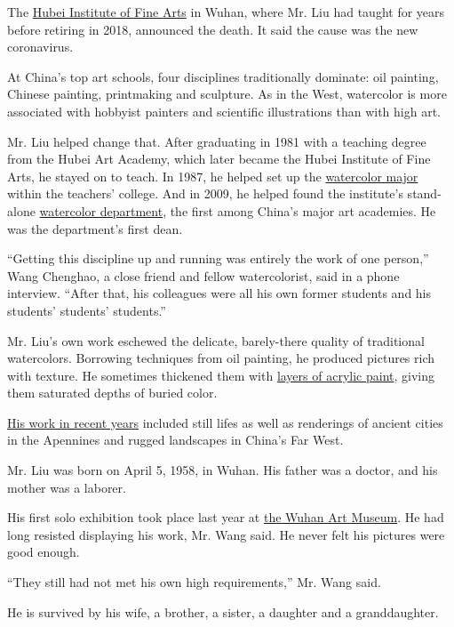 The \href{http://news.hifa.edu.cn/xxxw/xxxw/68034.htm}{Hubei Institute
of Fine Arts} in Wuhan, where Mr. Liu had taught for years before
retiring in 2018, announced the death. It said the cause was the new
coronavirus.

At China's top art schools, four disciplines traditionally dominate: oil
painting, Chinese painting, printmaking and sculpture. As in the West,
watercolor is more associated with hobbyist painters and scientific
illustrations than with high art.

Mr. Liu helped change that. After graduating in 1981 with a teaching
degree from the Hubei Art Academy, which later became the Hubei
Institute of Fine Arts, he stayed on to teach. In 1987, he helped set up
the \href{http://schx.hifa.edu.cn/xsky/xsjl/7694.htm}{watercolor major}
within the teachers' college. And in 2009, he helped found the
institute's stand-alone
\href{http://schx.hifa.edu.cn/yxgk/3650.htm}{watercolor department}, the
first among China's major art academies. He was the department's first
dean.

``Getting this discipline up and running was entirely the work of one
person,'' Wang Chenghao, a close friend and fellow watercolorist, said
in a phone interview. ``After that, his colleagues were all his own
former students and his students' students' students.''

Mr. Liu's own work eschewed the delicate, barely-there quality of
traditional watercolors. Borrowing techniques from oil painting, he
produced pictures rich with texture. He sometimes thickened them with
\href{https://v.qq.com/x/page/d0362bz7sf9.html}{layers of acrylic
paint}, giving them saturated depths of buried color.

\href{https://cn.canson.com/news/liu-shouxiang}{His work in recent
years} included still lifes as well as renderings of ancient cities in
the Apennines and rugged landscapes in China's Far West.

Mr. Liu was born on April 5, 1958, in Wuhan. His father was a doctor,
and his mother was a laborer.

His first solo exhibition took place last year at
\href{https://cn.canson.com/news/liu-shouxiang}{the Wuhan Art Museum}.
He had long resisted displaying his work, Mr. Wang said. He never felt
his pictures were good enough.

``They still had not met his own high requirements,'' Mr. Wang said.

He is survived by his wife, a brother, a sister, a daughter and a
granddaughter.

